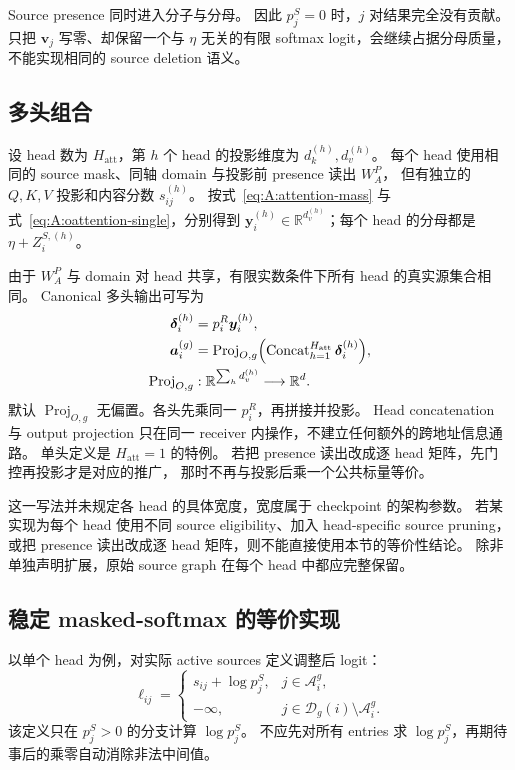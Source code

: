 \documentclass[11pt,UTF8,fontset=fandol]{ctexart}
\numberwithin{equation}{section}
\theoremstyle{definition}
\newcommand{\Dset}{\mathcal D}
\newcommand{\R}{\mathbb R}
\begin{document}
Source presence 同时进入分子与分母。
因此 $p_j^S=0$ 时，$j$ 对结果完全没有贡献。
只把 $\bm v_j$ 写零、却保留一个与 $\eta$ 无关的有限 softmax logit，会继续占据分母质量，
不能实现相同的 source deletion 语义。

\subsection{多头组合}
\label{subsec:A:multihead}

设 head 数为 $H_{\mathrm{att}}$，第 $h$ 个 head 的投影维度为
$d_k^{(h)},d_v^{(h)}$。
每个 head 使用相同的 source mask、同轴 domain 与投影前 presence 读出 $W_A^{P}$，
但有独立的 $Q,K,V$ 投影和内容分数 $s_{ij}^{(h)}$。
按式~\eqref{eq:A:attention-mass} 与式~\eqref{eq:A:oattention-single}，分别得到
$\bm y_i^{(h)}\in\R^{d_v^{(h)}}$；每个 head 的分母都是 $\eta+Z_i^{S,(h)}$。

由于 $W_A^{P}$ 与 domain 对 head 共享，有限实数条件下所有 head 的真实源集合相同。
Canonical 多头输出可写为
\begin{equation}
 \begin{aligned}
  \bm\delta_i^{(h)}
    &=p_i^R\bm y_i^{(h)},\\
  \bm a_i^{(g)}
    &=\operatorname{Proj}_{O,g}\Bigl(
      \operatorname{Concat}_{h=1}^{H_{\mathrm{att}}}\bm\delta_i^{(h)}\Bigr),\\
  \operatorname{Proj}_{O,g}&:
     \R^{\sum_h d_v^{(h)}}\longrightarrow\R^d.
 \end{aligned}
 \label{eq:A:oattention-multi}
\end{equation}
默认 $\operatorname{Proj}_{O,g}$ 无偏置。各头先乘同一 $p_i^R$，再拼接并投影。
Head concatenation 与 output projection
只在同一 receiver 内操作，不建立任何额外的跨地址信息通路。
单头定义是 $H_{\mathrm{att}}=1$ 的特例。
若把 presence 读出改成逐 head 矩阵，先门控再投影才是对应的推广，
那时不再与投影后乘一个公共标量等价。

这一写法并未规定各 head 的具体宽度，宽度属于 checkpoint 的架构参数。
若某实现为每个 head 使用不同 source eligibility、加入 head-specific
source pruning，或把 presence 读出改成逐 head 矩阵，则不能直接使用本节的等价性结论。
除非单独声明扩展，原始 source graph 在每个 head 中都应完整保留。

\subsection{稳定 masked-softmax 的等价实现}
\label{subsec:A:softmax}

以单个 head 为例，对实际 active sources 定义调整后 logit：
\begin{equation}
  \ell_{ij}
  =\begin{cases}
     s_{ij}+\log p_j^S,&j\in\mathcal A_i^g,\\
     -\infty,&j\in\Dset_g(i)\setminus\mathcal A_i^g.
   \end{cases}
  \label{eq:A:masked-logits}
\end{equation}
该定义只在 $p_j^S>0$ 的分支计算 $\log p_j^S$。
不应先对所有 entries 求 $\log p_j^S$，再期待事后的乘零自动消除非法中间值。
\end{document}
